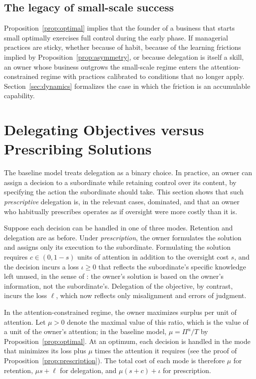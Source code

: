 \documentclass[11pt,a4paper]{article}
\theoremstyle{plain}
\begin{document}
\subsection{The legacy of small-scale success}

Proposition~\ref{prop:optimal} implies that the founder of a business that starts small optimally exercises full control during the early phase. If managerial practices are sticky, whether because of habit, because of the learning frictions implied by Proposition~\ref{prop:asymmetry}, or because delegation is itself a skill, an owner whose business outgrows the small-scale regime enters the attention-constrained regime with practices calibrated to conditions that no longer apply. Section~\ref{sec:dynamics} formalizes the case in which the friction is an accumulable capability.

\section{Delegating Objectives versus Prescribing Solutions}\label{sec:prescription}

The baseline model treats delegation as a binary choice. In practice, an owner can assign a decision to a subordinate while retaining control over its content, by specifying the action the subordinate should take. This section shows that such \emph{prescriptive} delegation is, in the relevant cases, dominated, and that an owner who habitually prescribes operates as if oversight were more costly than it is.

Suppose each decision can be handled in one of three modes. Retention and delegation are as before. Under \emph{prescription}, the owner formulates the solution and assigns only its execution to the subordinate. Formulating the solution requires $c \in (0, 1 - s)$ units of attention in addition to the oversight cost $s$, and the decision incurs a loss $\iota \ge 0$ that reflects the subordinate's specific knowledge left unused, in the sense of \citet{jensen1992}: the owner's solution is based on the owner's information, not the subordinate's. Delegation of the objective, by contrast, incurs the loss $\ell$, which now reflects only misalignment and errors of judgment.

In the attention-constrained regime, the owner maximizes surplus per unit of attention. Let $\mu > 0$ denote the maximal value of this ratio, which is the value of a unit of the owner's attention; in the baseline model, $\mu = \Pi^u / T$ by Proposition~\ref{prop:optimal}. At an optimum, each decision is handled in the mode that minimizes its loss plus $\mu$ times the attention it requires (see the proof of Proposition~\ref{prop:prescription}). The total cost of each mode is therefore $\mu$ for retention, $\mu s + \ell$ for delegation, and $\mu(s + c) + \iota$ for prescription.
\end{document}
